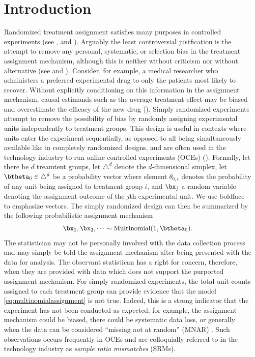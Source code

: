 \documentclass[11pt]{article}
\begin{document}
\section{Introduction}
\label{sec:intro}
Randomized treatment assignment satisfies many purposes in controlled experiments (see \cite{kempthorne}, \cite{cox} and \cite{rubin}).
Arguably the least controversial justfication is the attempt to remove any personal, systematic, or selection bias in the treatment assignment mechanism, although this is neither without criticism nor without alternative (see \cite{lindley} and \cite{kadane}).
Consider, for example, a medical researcher who administers a preferred experimental drug to only the patients most likely to recover.
Without explicitly conditioning on this information in the assignment mechanism, causal estimands such as the average treatment effect may be biased and overestimate the efficacy of the new drug (\cite{berry}).
Simply randomized experiments attempt to remove the possibility of bias by randomly assigning experimental units independently to treatment groups.
This design is useful in contexts where units enter the experiment sequentially, as opposed to all being simultaneously available like in completely randomized designs, and are often used in the technology industry to run online controlled experiments (OCEs) (\cite{oce}).
Formally, let there be $d$ treamtent groups, let $\triangle^d$ denote the $d$-dimensional simplex, let $\btheta_0 \in \triangle^d$ be a probability vector where element $\theta_{0,i}$ denotes the probability of any unit being assigned to treatment group $i$, and $\bx_j$ a random variable denoting the assignment outcome of the $j$th experimental unit.
We use boldface to emphasize vectors.
The simply randomized design can then be summarized by the following probabilistic assignment mechanism
\begin{equation}
  \label{eq:multinomialassignment}
  \bx_1,\bx_2, \dots \sim \text{Multinomial}(1,\btheta_0).
\end{equation}
The statistician may not be personally involved with the data collection process and may simply be told the assignment mechanism after being presented with the data for analysis.
The observant statistican has a right for concern, therefore, when they are provided with data which does not support the purported assignment mechanism.
For simply randomized experiments, the total unit counts assigned to each treatment group can provide evidence that the model \eqref{eq:multinomialassignment} is not true.
Indeed, this is a strong indicator that the experiment has not been conducted as expected; for example, the assignment mechanism could be biased, there could be systematic data loss, or generally when the data can be considered ``missing not at random'' (MNAR) \citep{missing-data}.
Such observations occurs frequently in OCEs and are colloquially referred to in the technology industry as \textit{sample ratio mismatches} (SRMs).
\end{document}
